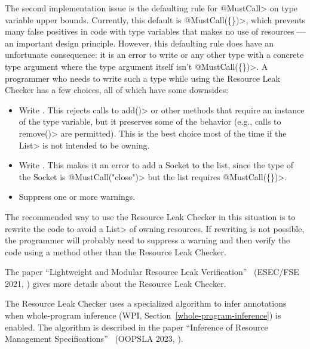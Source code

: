 The second implementation issue is the defaulting rule for \<@MustCall> on
type variable upper bounds.  Currently, this default is \<@MustCall(\{\})>,
which prevents many false positives in code with type variables that makes
no use of resources --- an important design principle.
However, this defaulting rule does have an unfortunate consequence: it is
an error to write  or any other type with a concrete
type argument where the type argument itself isn't \<@MustCall(\{\})>. A programmer who
needs to write such a type while using the Resource Leak Checker has a few
choices, all of which have some downsides:

\begin{itemize}
\item Write . This rejects calls to \<add()>
or other methods that require an instance of the type variable, but it
preserves some of the behavior (e.g., calls to \<remove()> are permitted).
This is the best choice most of the time if the \<List> is not intended to
be owning.
\item Write . This makes it an error to
add a Socket to the list, since the type of the Socket is
\<@MustCall("close")> but the list requires \<@MustCall(\{\})>.
\item Suppress one or more warnings.
\end{itemize}

The recommended way to use the Resource Leak Checker in this situation is
to rewrite the code to avoid a \<List> of owning resources. If rewriting is
not possible, the programmer will probably need to suppress a warning and
then verify the code using a method other than the Resource Leak Checker.



The paper ``Lightweight and Modular Resource Leak
Verification''~\cite{KelloggSSE2021} (ESEC/FSE 2021,
)
gives more details about the Resource Leak Checker.

The Resource Leak Checker uses a specialized algorithm to infer annotations
when whole-program inference (WPI, Section~\ref{whole-program-inference})
is enabled.  The algorithm is described in the paper ``Inference of
Resource Management Specifications''~\cite{ShadabGTEKLLS2023} (OOPSLA 2023,
).


